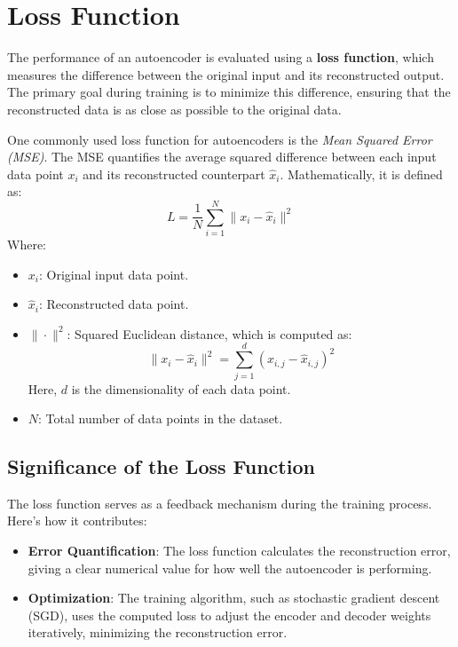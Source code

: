 \documentclass[a4paper,12pt]{article}
\begin{document}
\section{Loss Function}
The performance of an autoencoder is evaluated using a \textbf{loss function}, which measures the difference between the original input and its reconstructed output. The primary goal during training is to minimize this difference, ensuring that the reconstructed data is as close as possible to the original data.  

One commonly used loss function for autoencoders is the \textit{Mean Squared Error (MSE)}. The MSE quantifies the average squared difference between each input data point \( x_i \) and its reconstructed counterpart \( \hat{x}_i \). Mathematically, it is defined as:
\begin{equation}
L = \frac{1}{N} \sum_{i=1}^{N} \|x_i - \hat{x}_i\|^2
\end{equation}
Where:
\begin{itemize}
    \item \( x_i \): Original input data point.  
    \item \( \hat{x}_i \): Reconstructed data point.  
    \item \( \| \cdot \|^2 \): Squared Euclidean distance, which is computed as:
    \[
    \|x_i - \hat{x}_i\|^2 = \sum_{j=1}^{d} (x_{i,j} - \hat{x}_{i,j})^2
    \]
    Here, \( d \) is the dimensionality of each data point.  
    \item \( N \): Total number of data points in the dataset.  
\end{itemize}

\subsection{Significance of the Loss Function}
The loss function serves as a feedback mechanism during the training process. Here’s how it contributes:
\begin{itemize}
    \item \textbf{Error Quantification}: The loss function calculates the reconstruction error, giving a clear numerical value for how well the autoencoder is performing.  
    \item \textbf{Optimization}: The training algorithm, such as stochastic gradient descent (SGD), uses the computed loss to adjust the encoder and decoder weights iteratively, minimizing the reconstruction error.  
\end{itemize}
\end{document}
